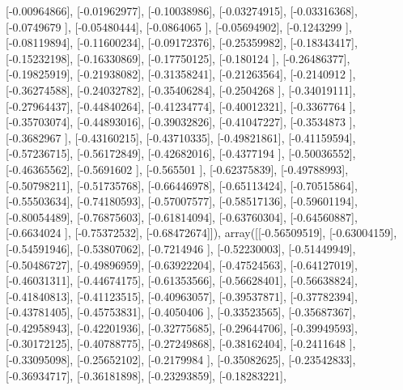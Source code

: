 \documentclass{article}
\begin{document}
       [-0.00964866],
       [-0.01962977],
       [-0.10038986],
       [-0.03274915],
       [-0.03316368],
       [-0.0749679 ],
       [-0.05480444],
       [-0.0864065 ],
       [-0.05694902],
       [-0.1243299 ],
       [-0.08119894],
       [-0.11600234],
       [-0.09172376],
       [-0.25359982],
       [-0.18343417],
       [-0.15232198],
       [-0.16330869],
       [-0.17750125],
       [-0.180124  ],
       [-0.26486377],
       [-0.19825919],
       [-0.21938082],
       [-0.31358241],
       [-0.21263564],
       [-0.2140912 ],
       [-0.36274588],
       [-0.24032782],
       [-0.35406284],
       [-0.2504268 ],
       [-0.34019111],
       [-0.27964437],
       [-0.44840264],
       [-0.41234774],
       [-0.40012321],
       [-0.3367764 ],
       [-0.35703074],
       [-0.44893016],
       [-0.39032826],
       [-0.41047227],
       [-0.3534873 ],
       [-0.3682967 ],
       [-0.43160215],
       [-0.43710335],
       [-0.49821861],
       [-0.41159594],
       [-0.57236715],
       [-0.56172849],
       [-0.42682016],
       [-0.4377194 ],
       [-0.50036552],
       [-0.46365562],
       [-0.5691602 ],
       [-0.565501  ],
       [-0.62375839],
       [-0.49788993],
       [-0.50798211],
       [-0.51735768],
       [-0.66446978],
       [-0.65113424],
       [-0.70515864],
       [-0.55503634],
       [-0.74180593],
       [-0.57007577],
       [-0.58517136],
       [-0.59601194],
       [-0.80054489],
       [-0.76875603],
       [-0.61814094],
       [-0.63760304],
       [-0.64560887],
       [-0.6634024 ],
       [-0.75372532],
       [-0.68472674]]), array([[-0.56509519],
       [-0.63004159],
       [-0.54591946],
       [-0.53807062],
       [-0.7214946 ],
       [-0.52230003],
       [-0.51449949],
       [-0.50486727],
       [-0.49896959],
       [-0.63922204],
       [-0.47524563],
       [-0.64127019],
       [-0.46031311],
       [-0.44674175],
       [-0.61353566],
       [-0.56628401],
       [-0.56638824],
       [-0.41840813],
       [-0.41123515],
       [-0.40963057],
       [-0.39537871],
       [-0.37782394],
       [-0.43781405],
       [-0.45753831],
       [-0.4050406 ],
       [-0.33523565],
       [-0.35687367],
       [-0.42958943],
       [-0.42201936],
       [-0.32775685],
       [-0.29644706],
       [-0.39949593],
       [-0.30172125],
       [-0.40788775],
       [-0.27249868],
       [-0.38162404],
       [-0.2411648 ],
       [-0.33095098],
       [-0.25652102],
       [-0.2179984 ],
       [-0.35082625],
       [-0.23542833],
       [-0.36934717],
       [-0.36181898],
       [-0.23293859],
       [-0.18283221],
\end{document}
